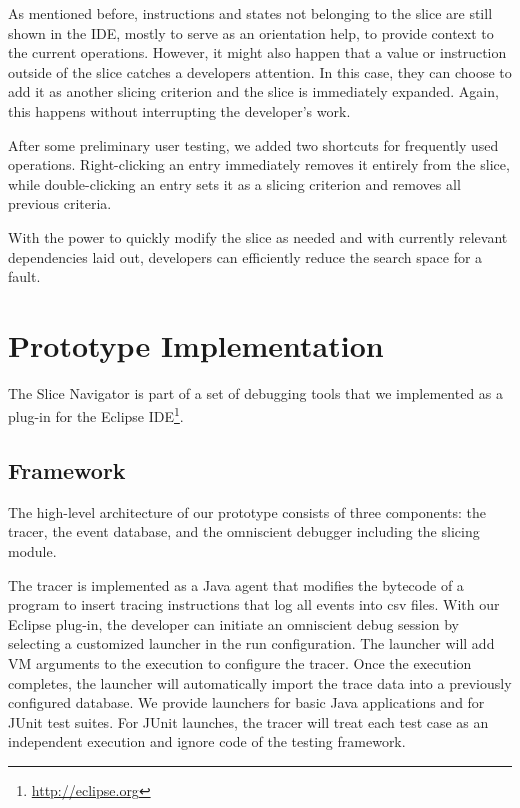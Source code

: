 \documentclass[
			english,
			review,
			]{elsarticle}
\begin{document}
As mentioned before, instructions and states not belonging to the slice are still shown in the IDE, mostly to serve as an orientation help, to provide context to the current operations.
However, it might also happen that a value or instruction outside of the slice catches a developers attention.
In this case, they can choose to add it as another slicing criterion and the slice is immediately expanded.
Again, this happens without interrupting the developer's work.

After some preliminary user testing, we added two shortcuts for frequently used operations.
Right-clicking an entry immediately removes it entirely from the slice, while double-clicking an entry sets it as a slicing criterion and removes all previous criteria.

With the power to quickly modify the slice as needed and with currently relevant dependencies laid out, developers can efficiently reduce the search space for a fault.

\section{Prototype Implementation}
\label{sec:impl}

The Slice Navigator is part of a set of debugging tools that we implemented as a plug-in for the Eclipse IDE\footnote{\url{http://eclipse.org}}.

\subsection{Framework}

The high-level architecture of our prototype consists of three components: the tracer, the event database, and the omniscient debugger including the slicing module.

The tracer is implemented as a Java agent that modifies the bytecode of a program to insert tracing instructions that log all events into csv files.
With our Eclipse plug-in, the developer can initiate an omniscient debug session by selecting a customized launcher in the run configuration.
The launcher will add VM arguments to the execution to configure the tracer.
Once the execution completes, the launcher will automatically import the trace data into a previously configured database.
We provide launchers for basic Java applications and for JUnit test suites.
For JUnit launches, the tracer will treat each test case as an independent execution and ignore code of the testing framework.
\end{document}
